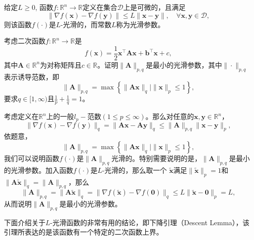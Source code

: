 \begin{definition}[$L$-光滑]
    给定$L \geq 0$, 函数$f: \mathbb{R}^{n} \rightarrow \mathbb{R}$定义在集合$\mathcal{D}$上是可微的，且满足
\begin{equation}
    \|\nabla f(\bm{x})-\nabla f(\bm{y})\| \leq L\|\bm{x}-\bm{y}\|, \quad \forall \bm{x}, \bm{y} \in \mathcal{D},
    \nonumber
\end{equation}
则该函数$f(\cdot)$是$L$-光滑的，而常数$L$称为光滑参数。
\end{definition}

\begin{problem}[二次函数的$L$-光滑]
    考虑二次函数$f: \mathbb{R}^{n} \rightarrow \mathbb{R}$是
    \begin{equation}
        f(\bm{x})=\frac{1}{2} \bm{x}^{\top} \bm{A} \bm{x}+\bm{b}^{\top} \bm{x}+c,
        \nonumber
    \end{equation}
其中$\bm{A} \in \mathbb{R}^{n}$为对称矩阵且$c \in \mathbb{R}$。证明$\|\bm{A}\|_{p, q}$是最小的光滑参数，其中$\|\cdot\|_{p, q}$表示诱导范数，即
    \begin{equation}
        \|\bm{A}\|_{p, q}=\max \left\{\|\bm{A} \bm{x}\|_{q} \mid\|\bm{x}\|_{p} \leq 1\right\},
        \nonumber
    \end{equation}
要求$q \in[1, \infty)$且$\frac{1}{p}+\frac{1}{q}=1$。
\end{problem}
\begin{solution}
    考虑定义在$\mathbb{R}^{n}$上的一般$l_{p} -$范数$(1 \leq p \leq \infty)$。那么对任意的$\bm{x}, \bm{y} \in \mathbb{R}^{n}$，
    \begin{equation}
        \|\nabla f(\bm{x})-\nabla f(\bm{y})\|_{q}=\|\bm{A} \bm{x}-\bm{A} \bm{y}\|_{q} \leq\|\bm{A}\|_{p, q}\|\bm{x}-\bm{y}\|_{p},
        \nonumber
    \end{equation}
    依题意，
    \begin{equation}
        \|\bm{A}\|_{p, q}=\max \left\{\|\bm{A} \bm{x}\|_{q} \mid\|\bm{x}\|_{p} \leq 1\right\},
        \nonumber
    \end{equation}
    我们可以说明函数$f(\cdot)$是$\|\bm{A}\|_{p, q}$光滑的。特别需要说明的是，$\|\bm{A}\|_{p, q}$是最小的光滑参数。加入函数$f(\cdot)$是$L$-光滑的，那么取一个 $\tilde{\bm{x}}$满足$\|\tilde{\bm{x}}\|_{p}=1$和$ \|\bm{A} \tilde{\bm{x}}\|_{q}=\|\bm{A}\|_{p, q}$，那么
    \begin{equation}
        \|\bm{A}\|_{p, q}=\|\bm{A} \tilde{\bm{x}}\|_{q}=\|\nabla f(\tilde{\bm{x}})-\nabla f(\mathbf{0})\|_{q} \leq L\|\tilde{\bm{x}}-\mathbf{0}\|_{p}=L,
        \nonumber
    \end{equation}
从而说明$\|\bm{A}\|_{p, q}$是最小的光滑参数。
\end{solution}
\par 下面介绍关于$L$-光滑函数的非常有用的结论，即下降引理（Descent Lemma）\cite{2017FirstOrder}，该引理所表达的是该函数有一个特定的二次函数上界。

